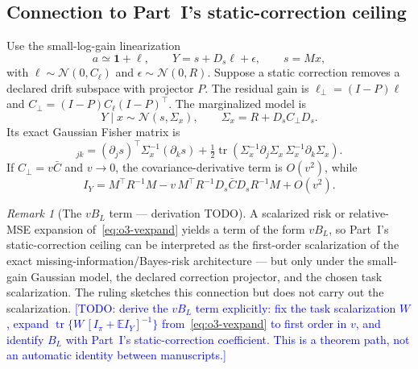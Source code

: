\documentclass[11pt]{article}
\newcommand{\TODO}[1]{\textcolor{blue}{[TODO: #1]}}
\newcommand{\tr}{\operatorname{tr}}
\newcommand{\E}{\mathbb{E}}
\theoremstyle{remark}
\newtheorem{remark}{Remark}
\begin{document}
\subsection{Connection to Part~I's static-correction ceiling}
\label{sec:o3-vbl}
Use the small-log-gain linearization
\begin{equation*}
a \simeq \mathbf 1 + \ell,
\qquad
Y = s + D_s \ell + \epsilon,
\qquad
s = Mx,
\end{equation*}
with $\ell \sim \mathcal N(0, C_\ell)$ and $\epsilon \sim \mathcal N(0, R)$.
Suppose a static correction removes a declared drift subspace with projector
$P$. The residual gain is $\ell_\perp = (I-P)\ell$ and
$C_\perp = (I-P)C_\ell(I-P)^\top$. The marginalized model is
\begin{equation}
Y\mid x \sim \mathcal N(s, \Sigma_x),
\qquad
\Sigma_x = R + D_s C_\perp D_s.
\tag{O3.4}\label{eq:o3-marg}
\end{equation}
Its exact Gaussian Fisher matrix is
\begin{equation}
[I_Y]_{jk}
= (\partial_j s)^\top \Sigma_x^{-1} (\partial_k s)
+ \tfrac12 \tr\!\left( \Sigma_x^{-1} \partial_j\Sigma_x\, \Sigma_x^{-1}
\partial_k\Sigma_x \right).
\tag{O3.5}\label{eq:o3-gaussfisher}
\end{equation}
If $C_\perp = v\bar C$ and $v\to0$, the covariance-derivative term is $O(v^2)$,
while
\begin{equation}
I_Y = M^\top R^{-1} M
- v\, M^\top R^{-1} D_s \bar C D_s R^{-1} M
+ O(v^2).
\tag{O3.6}\label{eq:o3-vexpand}
\end{equation}

\begin{remark}[The $vB_L$ term --- derivation TODO]
\label{rem:o3-todo}
A scalarized risk or relative-MSE expansion of~\eqref{eq:o3-vexpand} yields a
term of the form $v B_L$, so Part~I's static-correction ceiling can be
interpreted as the first-order scalarization of the exact
missing-information/Bayes-risk architecture --- but only under the small-gain
Gaussian model, the declared correction projector, and the chosen task
scalarization. The ruling sketches this connection but does not carry out the
scalarization. \TODO{derive the $vB_L$ term explicitly: fix the task
scalarization $W$, expand $\tr\{W\,[I_\pi+\E I_Y]^{-1}\}$
from~\eqref{eq:o3-vexpand} to first order in $v$, and identify $B_L$ with
Part~I's static-correction coefficient. This is a theorem path, not an
automatic identity between manuscripts.}
\end{remark}
\end{document}
